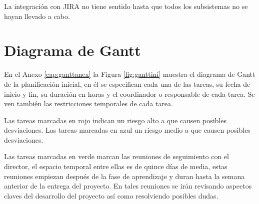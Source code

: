 La integración con JIRA no tiene sentido hasta que todos los subsistemas no se hayan llevado a cabo.

\section{Diagrama de Gantt}\label{sec:ganttantiguo}
En el Anexo \ref{cap:ganttanex} la Figura \ref{fig:ganttini} muestra el diagrama de Gantt de la planificación inicial, en él se especifican cada una de las tareas, su fecha de inicio y fin, su duración en horas y el coordinador o responsable de cada tarea. Se ven también las restricciones temporales de cada tarea.

Las tareas marcadas en rojo indican un riesgo alto a que causen posibles desviaciones.
Las tareas marcadas en azul un riesgo medio a que causen posibles desviaciones.

Las tareas marcadas en verde marcan las reuniones de seguimiento con el director, el espacio temporal entre ellas es de quince días de media, estas reuniones empiezan después de la fase de aprendizaje y duran hasta la semana anterior de la entrega del proyecto. En tales reuniones se irán revisando aspectos claves del desarrollo del proyecto así como resolviendo posibles dudas.









